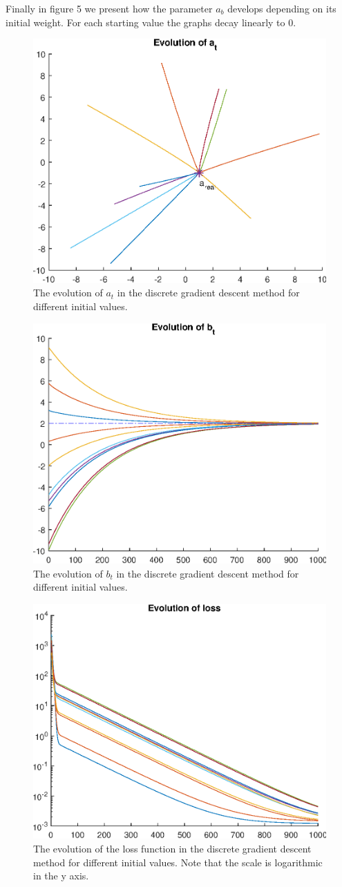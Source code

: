 Finally in figure 5 we
present how the parameter $ a_b $ develops depending
on its initial weight. For each starting value the graphs 
decay linearly to $ 0 $.

\begin{figure}[H]
	\centering
	\includegraphics[width=0.5\linewidth]{EvolutionA}
	\caption{The evolution of $ a_t $ in the
	discrete gradient descent method for different
	initial values.}\label{fig:exampleA}
\end{figure}

\begin{figure}[H]
	\centering
	\includegraphics[width=0.5\linewidth]{EvolutionB}
	\caption{The evolution of $ b_t $ in the
		discrete gradient descent method for different
		initial values.}\label{fig:exampleB}
\end{figure}

\begin{figure}[H]
	\centering
	\includegraphics[width=0.5\linewidth]{EvolutionLoss}
	\caption{The evolution of the loss function in the
		discrete gradient descent method for different
		initial values. Note that the scale is logarithmic
		in the y axis.}\label{fig:exampleLoss}
\end{figure}